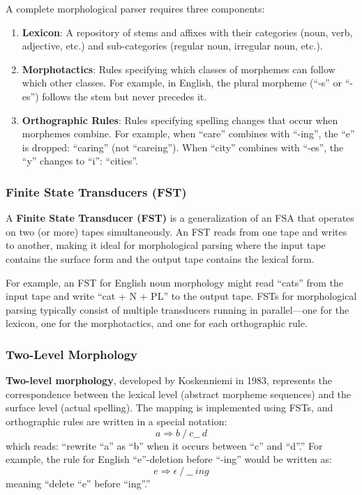 \documentclass[11pt,a4paper]{article}
\begin{document}
A complete morphological parser requires three components:
\begin{enumerate}
    \item \textbf{Lexicon}: A repository of stems and affixes with their categories (noun, verb, adjective, etc.) and sub-categories (regular noun, irregular noun, etc.).
    \item \textbf{Morphotactics}: Rules specifying which classes of morphemes can follow which other classes. For example, in English, the plural morpheme (``-s'' or ``-es'') follows the stem but never precedes it.
    \item \textbf{Orthographic Rules}: Rules specifying spelling changes that occur when morphemes combine. For example, when ``care'' combines with ``-ing'', the ``e'' is dropped: ``caring'' (not ``careing''). When ``city'' combines with ``-es'', the ``y'' changes to ``i'': ``cities''.
\end{enumerate}

\subsubsection{Finite State Transducers (FST)}

A \textbf{Finite State Transducer (FST)} is a generalization of an FSA that operates on two (or more) tapes simultaneously. An FST reads from one tape and writes to another, making it ideal for morphological parsing where the input tape contains the surface form and the output tape contains the lexical form.

For example, an FST for English noun morphology might read ``cats'' from the input tape and write ``cat + N + PL'' to the output tape. FSTs for morphological parsing typically consist of multiple transducers running in parallel---one for the lexicon, one for the morphotactics, and one for each orthographic rule.

\subsubsection{Two-Level Morphology}

\textbf{Two-level morphology}, developed by Koskenniemi in 1983, represents the correspondence between the lexical level (abstract morpheme sequences) and the surface level (actual spelling). The mapping is implemented using FSTs, and orthographic rules are written in a special notation:
\[
a \Rightarrow b \ / \ c \_\_ \ d
\]
which reads: ``rewrite ``a'' as ``b'' when it occurs between ``c'' and ``d''.'' For example, the rule for English ``e''-deletion before ``-ing'' would be written as:
\[
e \Rightarrow \epsilon \ / \ \_\_ \ ing
\]
meaning ``delete ``e'' before ``ing''.''
\end{document}
